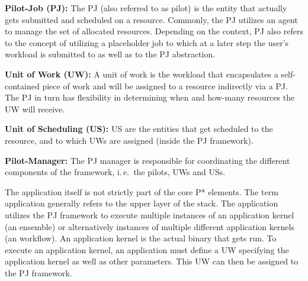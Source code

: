 \documentclass[conference,final]{IEEEtran}
\newcommand{\jhanote}[1]{ {\textcolor{red} { ***shantenu: #1 }}}
\newcommand{\alnote}[1]{ {\textcolor{blue} { ***andre: #1 }}}
\newcommand{\alnote}[1]{}
\newcommand{\jhanote}[1]{}
\begin{document}
\begin{compactitem}
\item \textbf{Pilot-Job (PJ):} The PJ (also referred to as pilot) is the
  entity that actually gets submitted and scheduled on a resource. 
  Commonly, the PJ utilizes an agent to manage the
  set of allocated resources. Depending on the context, PJ also refers to the 
  concept of utilizing a placeholder job to which at a later step the user's 
  workload is submitted to as well as to the PJ abstraction.

\item \textbf{Unit of Work (UW):} A unit of work is the workload that
  encapsulates a self-contained piece of work and will be assigned to
  a resource indirectly via a PJ.  The PJ in turn has
  flexibility in determining when and how-many resources the UW will
  receive.

\item \textbf{Unit of Scheduling (US):} US are the entities 
  that get scheduled to the resource, and to which UWs are assigned
  (inside the PJ framework). 
  



\item \textbf{Pilot-Manager:} The PJ manager is responsible for coordinating
	  the different components of the framework, i.\,e.\ the pilots, UWs and 
	  USs.
\end{compactitem}
The application itself is not strictly part of the core P* elements. The term
application generally refers to the upper layer of the stack. The application
utilizes the PJ framework to execute multiple instances of an application kernel
(an ensemble) or alternatively instances of multiple different application
kernels (an workflow). An application kernel is the actual binary that gets run.
To execute an application kernel, an application must define a UW specifying the
application kernel as well as other parameters. This UW can then be assigned to
the PJ framework.
	
\end{document}
